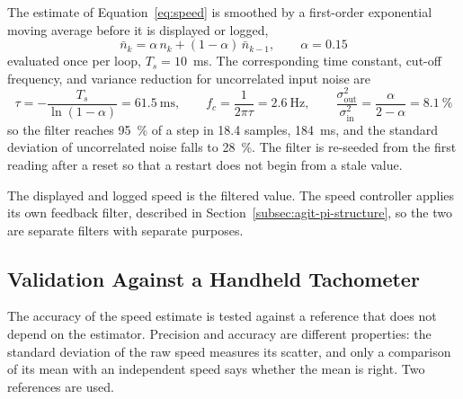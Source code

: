The estimate of Equation~\ref{eq:speed} is smoothed by a first-order exponential moving average before it is displayed or logged,
\begin{equation}
    \bar{n}_k = \alpha\, n_k + (1 - \alpha)\, \bar{n}_{k-1}, \qquad \alpha = 0.15
    \label{eq:ema}
\end{equation}
evaluated once per loop, $T_s = 10$~ms. The corresponding time constant, cut-off frequency, and variance reduction for uncorrelated input noise are
\begin{equation}
    \tau = -\frac{T_s}{\ln(1 - \alpha)} = 61.5\ \text{ms}, \qquad f_c = \frac{1}{2\pi\tau} = 2.6\ \text{Hz}, \qquad \frac{\sigma_{\mathrm{out}}^{2}}{\sigma_{\mathrm{in}}^{2}} = \frac{\alpha}{2 - \alpha} = 8.1\ \%
    \label{eq:ema-props}
\end{equation}
so the filter reaches 95~\% of a step in 18.4 samples, 184~ms, and the standard deviation of uncorrelated noise falls to 28~\%. The filter is re-seeded from the first reading after a reset so that a restart does not begin from a stale value.

The displayed and logged speed is the filtered value. The speed controller applies its own feedback filter, described in Section~\ref{subsec:agit-pi-structure}, so the two are separate filters with separate purposes.


\subsection{Validation Against a Handheld Tachometer}
\label{subsec:agit-speed-test}

The accuracy of the speed estimate is tested against a reference that does not depend on the estimator. Precision and accuracy are different properties: the standard deviation of the raw speed measures its scatter, and only a comparison of its mean with an independent speed says whether the mean is right. Two references are used.

